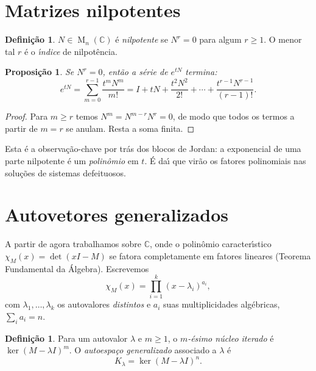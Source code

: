 \documentclass[11pt,a4paper]{amsart}
\newcommand{\C}{\mathbb{C}}
\DeclareMathOperator{\Mat}{M}
\theoremstyle{plain}
\newtheorem{proposicao}[teorema]{Proposição}
\theoremstyle{definition}
\newtheorem{definicao}[teorema]{Definição}
\theoremstyle{remark}
\begin{document}
\section{Matrizes nilpotentes}
\label{sec:nilp}

\begin{definicao}
$N\in\Mat_n(\C)$ \'e \emph{nilpotente} se $N^r=0$ para algum $r\ge1$. O menor
tal $r$ \'e o \emph{\'\i ndice} de nilpot\^encia.
\end{definicao}

\begin{proposicao}\label{prop:exp-nilp}
Se $N^r=0$, ent\~ao a s\'erie de $e^{tN}$ \emph{termina}:
\[
  e^{tN} = \sum_{m=0}^{r-1}\frac{t^m N^m}{m!}
         = I + tN + \frac{t^2 N^2}{2!} + \cdots + \frac{t^{r-1}N^{r-1}}{(r-1)!}.
\]
\end{proposicao}

\begin{proof}
Para $m\ge r$ temos $N^m = N^{m-r}N^r = 0$, de modo que todos os termos a
partir de $m=r$ se anulam. Resta a soma finita.
\end{proof}

Esta \'e a observa\c{c}\~ao-chave por tr\'as dos blocos de Jordan: a
exponencial de uma parte nilpotente \'e um \emph{polin\^omio} em $t$. \'E da\'\i
que vir\~ao os fatores polinomiais nas solu\c{c}\~oes de sistemas defeituosos.

\section{Autovetores generalizados}
\label{sec:gen}

A partir de agora trabalhamos sobre $\C$, onde o polin\^omio caracter\'\i stico
$\chi_M(x)=\det(xI-M)$ se fatora completamente em fatores lineares (Teorema
Fundamental da \'Algebra). Escrevemos
\[
  \chi_M(x) = \prod_{i=1}^{k}(x-\lambda_i)^{a_i},
\]
com $\lambda_1,\dots,\lambda_k$ os autovalores \emph{distintos} e $a_i$ suas
multiplicidades alg\'ebricas, $\sum_i a_i = n$.

\begin{definicao}\label{def:gen}
Para um autovalor $\lambda$ e $m\ge1$, o \emph{$m$-\'esimo n\'ucleo iterado}
\'e $\ker(M-\lambda I)^m$. O \emph{autoespa\c{c}o generalizado} associado a
$\lambda$ \'e
\[
  K_\lambda = \ker(M-\lambda I)^{n}.
\]
\end{definicao}
\end{document}
